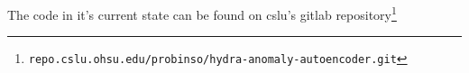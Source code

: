 \documentclass{article}
\begin{document}
\begin{multicols}{2}
The code in it's current state can be found on cslu's gitlab repository\footnote{\texttt{repo.cslu.ohsu.edu/probinso/hydra-anomaly-autoencoder.git}}

{}


\end{multicols}
\end{document}
